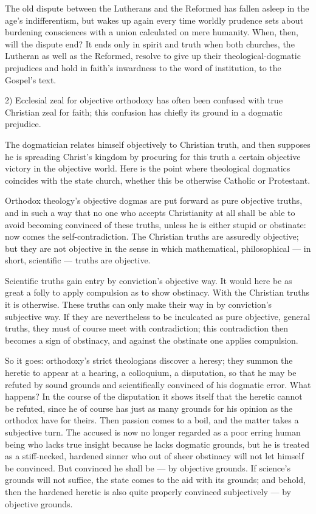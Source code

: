 \documentclass[12pt,a4paper]{book}
\begin{document}
The old dispute between the Lutherans and the Reformed has fallen asleep in the age's
indifferentism, but wakes up again every time worldly prudence sets about burdening consciences
with a union calculated on mere humanity. When, then, will the dispute end? It ends only in
spirit and truth when both churches, the Lutheran as well as the Reformed, resolve to give up
their theological-dogmatic prejudices and hold in faith's inwardness to the word of institution,
to the Gospel's text.

2) Ecclesial zeal for objective orthodoxy has often been confused with true Christian zeal for
faith; this confusion has chiefly its ground in a dogmatic prejudice.

The dogmatician relates himself objectively to Christian truth, and then supposes he is spreading
Christ's kingdom by procuring for this truth a certain objective victory in the objective world.
Here is the point where theological dogmatics coincides with the state church, whether this be
otherwise Catholic or Protestant.

Orthodox theology's objective dogmas are put forward as pure objective truths, and in such a way
that no one who accepts Christianity at all shall be able to avoid becoming convinced of these
truths, unless he is either stupid or obstinate: now comes the self-contradiction. The Christian
truths are assuredly objective; but they are not objective in the sense in which mathematical,
philosophical --- in short, scientific --- truths are objective.

Scientific truths gain entry by conviction's objective way. It would here be as great a folly to
apply compulsion as to show obstinacy. With the Christian truths it is otherwise. These truths
can only make their way in by conviction's subjective
way. If they are nevertheless to be inculcated as pure objective, general truths, they must of
course meet with contradiction; this contradiction then becomes a sign of obstinacy, and against
the obstinate one applies compulsion.

So it goes: orthodoxy's strict theologians discover a heresy; they summon the heretic to appear
at a hearing, a colloquium, a disputation, so that he may be refuted by sound grounds and
scientifically convinced of his dogmatic error. What happens? In the course of the disputation it
shows itself that the heretic cannot be refuted, since he of course has just as many grounds for
his opinion as the orthodox have for theirs. Then passion comes to a boil, and the matter takes a
subjective turn. The accused is now no longer regarded as a poor erring human being who lacks
true insight because he lacks dogmatic grounds, but he is treated as a stiff-necked, hardened
sinner who out of sheer obstinacy will not let himself be convinced. But convinced he shall be
--- by objective grounds. If science's grounds will not suffice, the state comes to the aid with
its grounds; and behold, then the hardened heretic is also quite properly convinced subjectively
--- by objective grounds.
\end{document}
